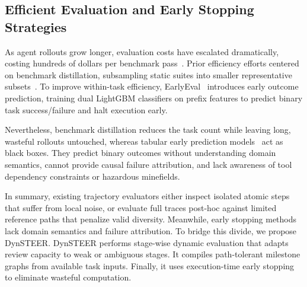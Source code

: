 \subsection{Efficient Evaluation and Early Stopping Strategies}
As agent rollouts grow longer, evaluation costs have escalated dramatically, costing hundreds of dollars per benchmark pass~\citep{shi2025earlyeval}. Prior efficiency efforts centered on benchmark distillation, subsampling static suites into smaller representative subsets~\citep{aslam2006statistical,shi2025earlyeval}. To improve within-task efficiency, EarlyEval~\citep{shi2025earlyeval} introduces early outcome prediction, training dual LightGBM classifiers on prefix features to predict binary task success/failure and halt execution early.

Nevertheless, benchmark distillation reduces the task count while leaving long, wasteful rollouts untouched, whereas tabular early prediction models~\citep{shi2025earlyeval} act as black boxes. They predict binary outcomes without understanding domain semantics, cannot provide causal failure attribution, and lack awareness of tool dependency constraints or hazardous minefields.

In summary, existing trajectory evaluators either inspect isolated atomic steps that suffer from local noise, or evaluate full traces post-hoc against limited reference paths that penalize valid diversity.
Meanwhile, early stopping methods lack domain semantics and failure attribution.
To bridge this divide, we propose DynSTEER. DynSTEER performs stage-wise dynamic evaluation that adapts review capacity to weak or ambiguous stages. It compiles path-tolerant milestone graphs from available task inputs. Finally, it uses execution-time early stopping to eliminate wasteful computation.
